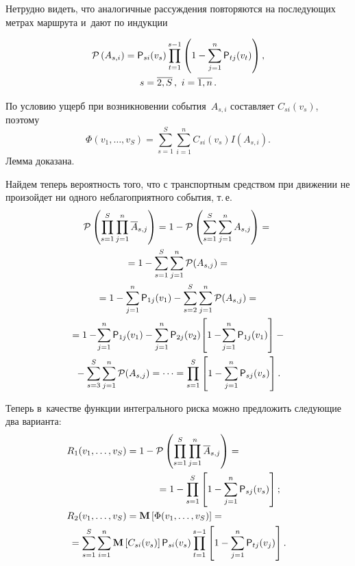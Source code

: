 \begin{multicols}{2}
     Нетрудно видеть, что аналогичные рас\-суж\-де\-ния повторяются на 
по\-сле\-ду\-ющих мет\-рах маршрута и~дают по индукции 

\pagebreak

\noindent
     \begin{multline*}
     \mathcal{P}\left( A_{s,i}\right) ={\sf P}_{si} (v_s) \prod\limits_{t=1}^{s-1} \left( 1-
\sum\limits^n_{j=1} {\sf P}_{tj}(v_t)\right),\\
 s=\overline{2,S}\,,\ i=\overline{1,n}\,.
\end{multline*}
    
     По условию ущерб при возникновении события~$A_{s,i}$ со\-став\-ля\-ет 
$C_{si}(v_s)$, поэтому 
$$
\Phi(v_1, \ldots , v_S)= \sum\limits^S_{s=1} 
\sum\limits^n_{i=1} C_{si}(v_s) I(A_{s,i}).
$$
 Лемма доказана.
     
     \smallskip
    
Найдем теперь вероятность того, что с транспортным средством при движении не 
произойдет ни одного неблагоприятного события, т.\,е. 
\begin{multline*}
\mathcal{P}\left( \prod\limits^S_{s=1} \prod\limits^n_{j=1} \overline{A}_{s,j}\right) 
=1-\mathcal{P}\left( \sum\limits^S_{s=1} \sum\limits^n_{j=1} A_{s,j}\right)={}\\
{}=
1-\sum\limits^S_{s=1} \sum\limits^n_{j=1} \mathcal{P}(A_{s,j})={}\\
{}= 1-\sum\limits^n_{j=1} {\sf P}_{1j}(v_1) -\sum\limits^S_{s=2} 
\sum\limits^n_{j=1}\mathcal{P}(A_{s,j}) ={}\\
{}= 1-\!\sum\limits^n_{j=1}  {\sf P}_{1j}(v_1) - \sum\limits^n_{j=1} {\sf P}_{2j}(v_2)\!\left[ 1- \!\sum\limits^n_{j=1} {\sf P}_{1j}(v_1)\right] -{}\\
{}- 
\sum\limits^S_{s=3} \sum\limits^n_{j=1} \mathcal{P}(A_{s,j}) =\cdots = 
\prod\limits^S_{s=1} \left[ 1-\sum\limits^n_{j=1} {\sf P}_{sj}(v_s)\right].
\end{multline*}
     
     Теперь в~качестве функции интегрального риска мож\-но предложить 
сле\-ду\-ющие два варианта: 
     \begin{align*}
     R_1(v_1, \ldots , v_S) &= 1-\mathcal{P} \left( \prod\limits^S_{s=1} 
\prod\limits^n_{j=1} \overline{A}_{s,j}\right) ={}\\
&\hspace*{11mm}{}=1-\prod\limits^S_{s=1} \left[ 1- 
\sum\limits^n_{j=1} {\sf P}_{sj}(v_s)\right];\hspace*{-0.68048pt}\\
     R_2(v_1, \ldots , v_S) &= \mathbf{M} \left[ \Phi(v_1, \ldots , v_S)\right] = {}&\\
&     \hspace*{-21mm}{}=
\sum\limits^S_{s=1} \sum\limits^n_{i=1} \mathbf{M} \left[ C_{si}(v_s)\right] 
{\sf P}_{si}(v_s) \prod\limits_{t=1}^{s-1} \left[ 1- \sum\limits^n_{j=1} {\sf P}_{tj}(v_j)\right].\hspace*{-6.9pt}
     \end{align*}
    

\end{multicols}
